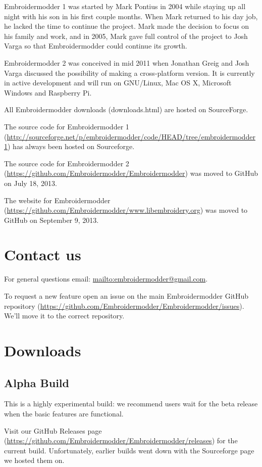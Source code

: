 \documentclass[a4paper]{report}
\begin{document}
Embroidermodder 1 was started by Mark Pontius in 2004 while staying up all night
with his son in his first couple months. When Mark returned to his day job, he
lacked the time to continue the project. Mark made the decision to focus on his
family and work, and in 2005, Mark gave full control of the project to Josh
Varga so that Embroidermodder could continue its growth.

Embroidermodder 2 was conceived in mid 2011 when Jonathan Greig and Josh Varga
discussed the possibility of making a cross-platform version. It is currently in
active development and will run on GNU/Linux, Mac OS X, Microsoft Windows and
Raspberry Pi.

All Embroidermodder downloads (downloads.html) are hosted on SourceForge.

The source code for Embroidermodder 1
(\url{http://sourceforge.net/p/embroidermodder/code/HEAD/tree/embroidermodder1})
has always been hosted on Sourceforge.

The source code for Embroidermodder 2
(\url{https://github.com/Embroidermodder/Embroidermodder}) was moved to GitHub
on July 18, 2013.

The website for Embroidermodder
(\url{https://github.com/Embroidermodder/www.libembroidery.org}) was moved to
GitHub on September 9, 2013.

\section{Contact us}

For general questions email: \url{mailto:embroidermodder@gmail.com}.

To request a new feature  open an issue on the main Embroidermodder GitHub
repository (\url{https://github.com/Embroidermodder/Embroidermodder/issues}).
We'll move it to the correct repository.

\section{Downloads}

\subsection{Alpha Build}

This is a highly experimental build: we recommend users wait for the beta
release when the basic features are functional.

Visit our  GitHub Releases page
(\url{https://github.com/Embroidermodder/Embroidermodder/releases})
for the current build. Unfortunately, earlier builds went down with the
Sourceforge page we hosted them on.
\end{document}
